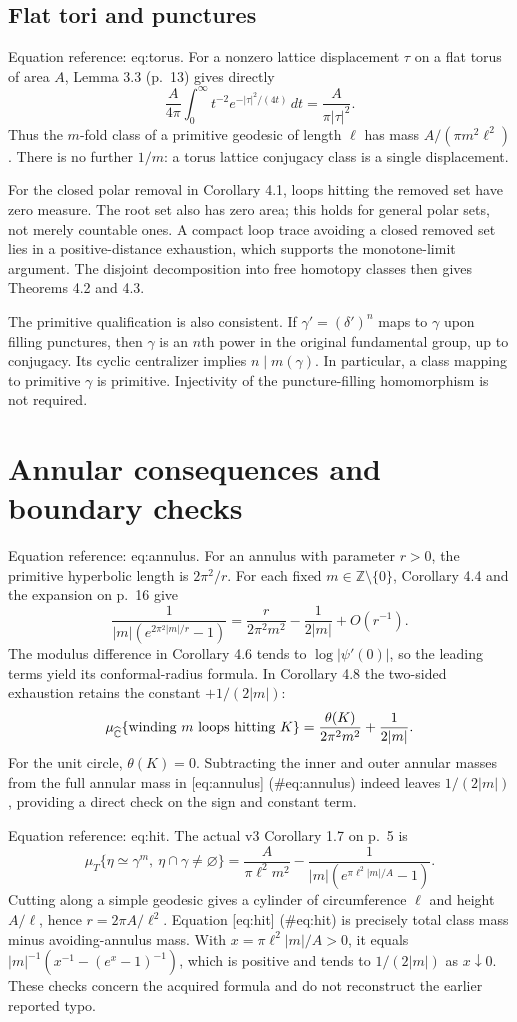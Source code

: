 \documentclass[10pt]{article}
\begin{document}
\subsection*{Flat tori and punctures}
Equation reference: eq:torus. For a nonzero lattice displacement \(\tau\) on a flat torus of area \(A\), Lemma 3.3 (p. 13) gives directly \[
 \frac{A}{4\pi}\int_0^\infty t^{-2}e^{-|\tau|^2/(4t)}\,dt
       =\frac{A}{\pi|\tau|^2}.\] Thus the \(m\)-fold class of a primitive geodesic of length \(\ell\) has mass \(A/(\pi m^2\ell^2)\). There is no further \(1/m\): a torus lattice conjugacy class is a single displacement.\par
For the closed polar removal in Corollary 4.1, loops hitting the removed set have zero measure. The root set also has zero area; this holds for general polar sets, not merely countable ones. A compact loop trace avoiding a closed removed set lies in a positive-distance exhaustion, which supports the monotone-limit argument. The disjoint decomposition into free homotopy classes then gives Theorems 4.2 and 4.3.\par
The primitive qualification is also consistent. If \(\gamma'=(\delta')^n\) maps to \(\gamma\) upon filling punctures, then \(\gamma\) is an \(n\)th power in the original fundamental group, up to conjugacy. Its cyclic centralizer implies \(n\mid m(\gamma)\). In particular, a class mapping to primitive \(\gamma\) is primitive. Injectivity of the puncture-filling homomorphism is not required.\par
\section*{Annular consequences and boundary checks}
Equation reference: eq:annulus. For an annulus with parameter \(r>0\), the primitive hyperbolic length is \(2\pi^2/r\). For each fixed \(m\in\mathbb Z\setminus\{0\}\), Corollary 4.4 and the expansion on p. 16 give \[
 \frac{1}{|m|(e^{2\pi^2|m|/r}-1)}
   =\frac{r}{2\pi^2m^2}-\frac{1}{2|m|}+O(r^{-1}).\] The modulus difference in Corollary 4.6 tends to \(\log|\psi'(0)|\), so the leading terms yield its conformal-radius formula. In Corollary 4.8 the two-sided exhaustion retains the constant \(+1/(2|m|)\): \[\mu_{\widehat{\mathbb C}}\{\hbox{winding }m\hbox{ loops hitting }K\}
   =\frac{\theta(K)}{2\pi^2m^2}+\frac{1}{2|m|}.\] For the unit circle, \(\theta(K)=0\). Subtracting the inner and outer annular masses from the full annular mass in [eq:annulus] (\#eq:annulus) indeed leaves \(1/(2|m|)\), providing a direct check on the sign and constant term.\par
Equation reference: eq:hit. The actual v3 Corollary 1.7 on p. 5 is \[
 \mu_T\{\eta\simeq\gamma^m,\ \eta\cap\gamma\ne\varnothing\}
 =\frac{A}{\pi\ell^2m^2}
  -\frac{1}{|m|(e^{\pi\ell^2|m|/A}-1)}.\] Cutting along a simple geodesic gives a cylinder of circumference \(\ell\) and height \(A/\ell\), hence \(r=2\pi A/\ell^2\). Equation [eq:hit] (\#eq:hit) is precisely total class mass minus avoiding-annulus mass. With \(x=\pi\ell^2|m|/A>0\), it equals \(|m|^{-1}(x^{-1}-(e^x-1)^{-1})\), which is positive and tends to \(1/(2|m|)\) as \(x\downarrow0\). These checks concern the acquired formula and do not reconstruct the earlier reported typo.\par
\end{document}

